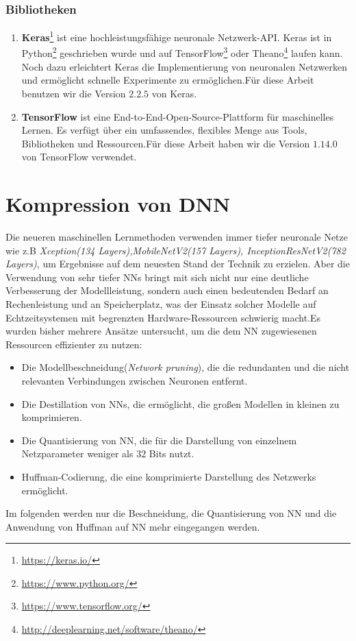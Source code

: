 \documentclass[12pt,a4paper]{scrartcl}
\numberwithin{equation}{section}
\begin{document}
\subsubsection{Bibliotheken}
\begin{enumerate}
	\item \textbf{Keras}\footnote{\href{https://keras.io/}{https://keras.io/}}
		 ist eine hochleistungsfähige neuronale Netzwerk-API. Keras ist in Python\footnote{\href{https://www.python.org/}{https://www.python.org/}} geschrieben wurde und auf TensorFlow\footnote{\href{https://www.tensorflow.org/}{https://www.tensorflow.org/}} oder Theano\footnote{\href{http://deeplearning.net/software/theano/}{http://deeplearning.net/software/theano/}} laufen kann. Noch dazu erleichtert Keras die Implementierung von neuronalen Netzwerken und ermöglicht schnelle Experimente zu ermöglichen.Für diese Arbeit benutzen wir die  Version  $ 2.2.5 $ von Keras.
	\item \textbf{TensorFlow}  ist eine End-to-End-Open-Source-Plattform für maschinelles Lernen. Es verfügt über ein umfassendes, flexibles Menge aus Tools, Bibliotheken und Ressourcen.Für diese Arbeit haben wir die  Version  $ 1.14.0 $ von TensorFlow verwendet.
	
\end{enumerate}

\section{Kompression von \ac{DNN}}
Die neueren maschinellen Lernmethoden verwenden immer tiefer neuronale Netze wie z.B \textit{Xception(134 Layers),MobileNetV2(157 Layers), InceptionResNetV2(782 Layers)}, um Ergebnisse auf dem neuesten Stand der Technik zu erzielen. Aber die Verwendung von sehr tiefer \acsp{NN} bringt mit sich nicht nur eine deutliche Verbesserung der Modellleistung, sondern auch einen bedeutenden Bedarf an Rechenleistung und an Speicherplatz, was der Einsatz solcher Modelle auf Echtzeitsystemen mit begrenzten Hardware-Ressourcen schwierig macht.Es wurden bisher mehrere Ansätze untersucht, um die dem \ac{NN} zugewiesenen Ressourcen effizienter zu nutzen:
\begin{itemize}
	\item Die Modellbeschneidung(\textit{Network pruning}), die die redundanten und  die nicht relevanten Verbindungen zwischen Neuronen entfernt.
	 \item Die Destillation von \acsp{NN}, die ermöglicht, die großen Modellen in kleinen  zu komprimieren. 	
 \item Die Quantisierung von \ac{NN}, die für die Darstellung von einzelnem Netzparameter weniger als $ 32 $ Bits nutzt.
 \item  Huffman-Codierung, die eine komprimierte Darstellung des Netzwerks ermöglicht.
\end{itemize} 
Im folgenden werden nur die Beschneidung, die Quantisierung von \ac{NN} und die Anwendung von Huffman auf \ac{NN} mehr eingegangen werden.
\end{document}
